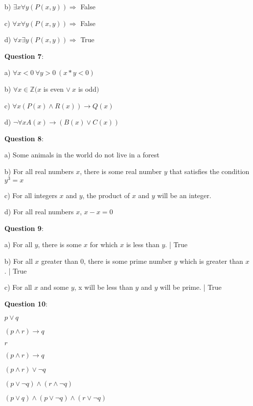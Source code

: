 \documentclass{article} %
\newcommand{\question}[2][]{\begin{flushleft}
        \textbf{Question #1}: \textit{#2}

\end{flushleft}}
\begin{document}
    b) $\exists x \forall y(P(x, y)) \Rightarrow$ False

    c) $\forall x \forall y(P(x, y)) \Rightarrow$ False

    d) $\forall x \exists y(P(x, y)) \Rightarrow$ True
    
    \question[7]{}
    
    a) $\forall x < 0\ \forall y > 0\ (x * y < 0)$

    b) $\forall x \in \mathbb{Z} (x$ is even $\lor\ x$ is odd$)$

    c) $\forall x (P(x) \land R(x)) \rightarrow Q(x)$

    d) $\neg \forall x A(x) \rightarrow (B(x) \lor C(x))$

    \question[8]{}

    a) Some animals in the world do not live in a forest

    b) For all real numbers $x$, there is some real number $y$ that satisfies the condition $y^3 = x$

    c) For all integers $x$ and $y$, the product of $x$ and $y$ will be an integer.

    d) For all real numbers $x$, $x-x=0$

    \question[9]{}

    a) For all $y$, there is some $x$ for which $x$ is less than $y$. | True 

    b) For all $x$ greater than 0, there is some prime number $y$ which is greater than $x$. | True

    c) For all $x$ and some $y$, x will be less than $y$ and $y$ will be prime. | True

    \newpage

    \question[10]{}

    \phantom{`}$p \lor q$

    \underline{$(p \land r) \rightarrow q$}

    \phantom{`}$r$

    \hspace{0cm}

    $(p \land r) \rightarrow q$

    $(p \land r) \lor \neg q$

    $(p \lor \neg q) \land (r \land \neg q)$

    \hspace{0cm}

    $(p \lor q) \land (p \lor \neg q) \land (r \lor \neg q)$
\end{document}
